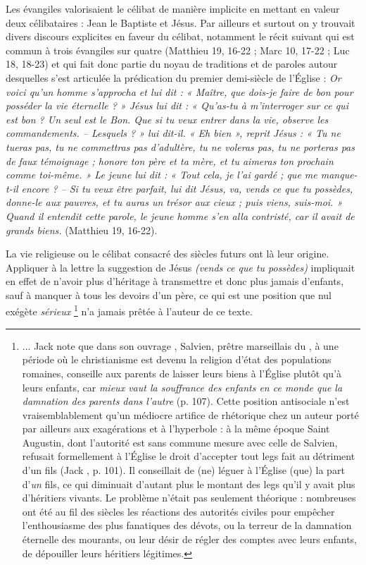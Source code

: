  Les évangiles valorisaient le célibat de manière implicite en mettant en valeur deux célibataires : Jean le Baptiste et Jésus. Par ailleurs et surtout on y trouvait divers discours explicites en faveur du célibat, notamment le récit suivant qui est commun à trois évangiles sur quatre (Matthieu 19, 16-22 ; Marc 10, 17-22 ; Luc 18, 18-23) et qui fait donc partie du noyau de traditions et de paroles autour desquelles s'est articulée la prédication du premier demi-siècle de l'Église : \emph{Or voici qu'un homme s'approcha et lui dit : « Maître, que dois-je faire de bon pour posséder la vie éternelle ? » Jésus lui dit : « Qu'as-tu à m'interroger sur ce qui est bon ? Un seul est le Bon. Que si tu veux entrer dans la vie, observe les commandements. -- Lesquels ? » lui dit-il. « Eh bien », reprit Jésus : « Tu ne tueras pas, tu ne commettras pas d'adultère, tu ne voleras pas, tu ne porteras pas de faux témoignage ; honore ton père et ta mère, et tu aimeras ton prochain comme toi-même. » Le jeune lui dit : « Tout cela, je l'ai gardé ; que me manque-t-il encore ? -- Si tu veux être parfait, lui dit Jésus, va, vends ce que tu possèdes, donne-le aux pauvres, et tu auras un trésor aux cieux ; puis viens, suis-moi. » Quand il entendit cette parole, le jeune homme s'en alla contristé, car il avait de grands biens.} (Matthieu 19, 16-22). 

 La vie religieuse ou le célibat consacré des siècles futurs ont là leur origine. Appliquer à la lettre la suggestion de Jésus \emph{(vends ce que tu possèdes)} impliquait en effet de n'avoir plus d'héritage à transmettre et donc plus jamais d'enfants, sauf à manquer à tous les devoirs d'un père, ce qui est une position que nul exégète \emph{sérieux}%
\footnote{... Jack  note que dans son ouvrage , Salvien, prêtre marseillais du , à une période où le christianisme est devenu la religion d'état des populations romaines, conseille aux parents de laisser leurs biens à l'Église plutôt qu'à leurs enfants, car \emph{mieux vaut la souffrance des enfants en ce monde que la damnation des parents dans l'autre} (p. 107). Cette position antisociale n'est vraisemblablement qu'un médiocre artifice de rhétorique chez un auteur porté par ailleurs aux exagérations et à l'hyperbole : à la même époque Saint Augustin, dont l'autorité est sans commune mesure avec celle de Salvien, refusait formellement à l'Église le droit d'accepter tout legs fait au détriment d'un fils (Jack , p. 101). Il conseillait de (ne) léguer à l'Église (que) la part d'\emph{un} fils, ce qui diminuait d'autant plus le montant des legs qu'il y avait plus d'héritiers vivants. Le problème n'était pas seulement théorique : nombreuses ont été au fil des siècles les réactions des autorités civiles pour empêcher l'enthousiasme des plus fanatiques des dévots, ou la terreur de la damnation éternelle des mourants, ou leur désir de régler des comptes avec leurs enfants, de dépouiller leurs héritiers légitimes.}
n'a jamais prêtée à l'auteur de ce texte. 

